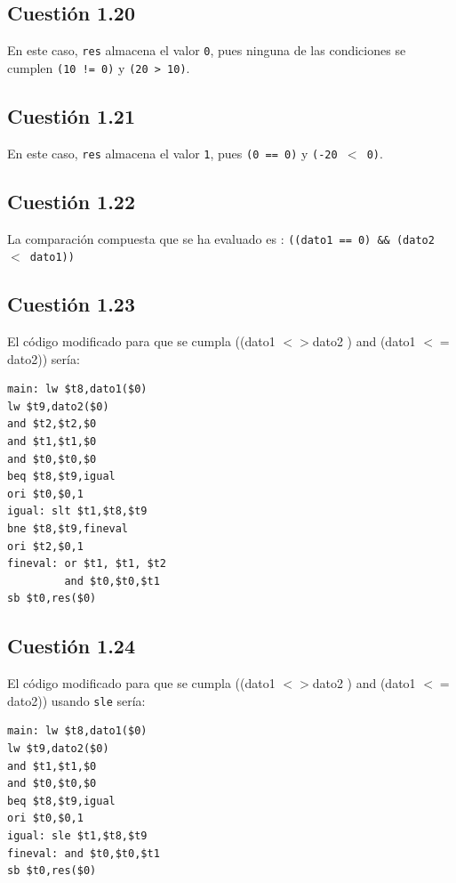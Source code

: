 \documentclass[11pt]{article}
\begin{document}
\begin{large}
\begin{flushleft}
\subsection*{Cuestión 1.20}
En este caso, \texttt{res} almacena el valor \texttt{0}, pues ninguna de las condiciones se cumplen \texttt{(10 != 0)} y \texttt{(20 > 10)}. 

\subsection*{Cuestión 1.21}
En este caso, \texttt{res} almacena el valor \texttt{1}, pues \texttt{(0 == 0)} y \texttt{(-20 $<$ 0)}. 

\subsection*{Cuestión 1.22}
La comparación compuesta que se ha evaluado es : \texttt{((dato1 == 0) \&\& (dato2 $<$ dato1))}

\subsection*{Cuestión 1.23}
El código modificado para que se cumpla ((dato1 $<>$dato2 ) and (dato1 $<=$ dato2)) sería:

\newpage

\begin{listing}[h]
\begin{verbatim}
main: lw $t8,dato1($0)
lw $t9,dato2($0)
and $t2,$t2,$0
and $t1,$t1,$0
and $t0,$t0,$0
beq $t8,$t9,igual
ori $t0,$0,1
igual: slt $t1,$t8,$t9
bne $t8,$t9,fineval
ori $t2,$0,1
fineval: or $t1, $t1, $t2  
         and $t0,$t0,$t1
sb $t0,res($0)

\end{verbatim}
\end{listing}

\subsection*{Cuestión 1.24}
El código modificado para que se cumpla ((dato1 $<>$dato2 ) and (dato1 $<=$ dato2)) usando \texttt{sle} sería:

\begin{listing}[h]
\begin{verbatim}
main: lw $t8,dato1($0)
lw $t9,dato2($0)
and $t1,$t1,$0
and $t0,$t0,$0
beq $t8,$t9,igual
ori $t0,$0,1
igual: sle $t1,$t8,$t9
fineval: and $t0,$t0,$t1
sb $t0,res($0)


\end{verbatim}
\end{listing}
\end{flushleft}
\end{large}
\end{document}
